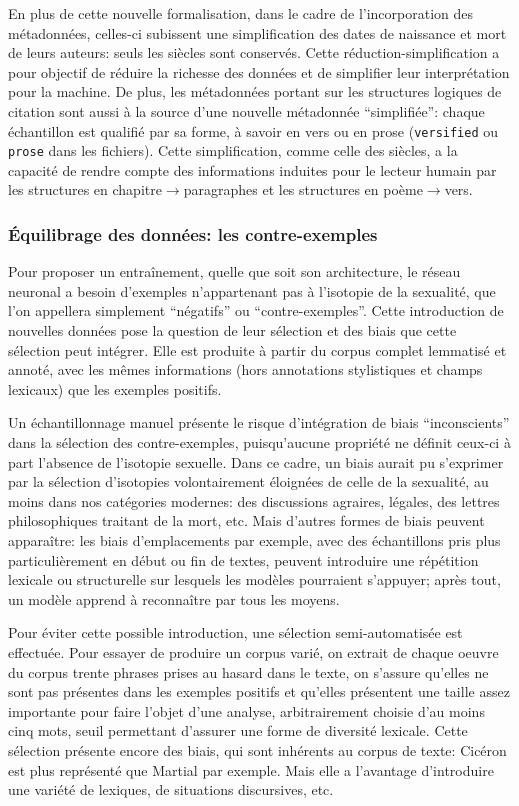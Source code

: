 En plus de cette nouvelle formalisation, dans le cadre de l'incorporation des métadonnées, celles-ci subissent une simplification des dates de naissance et mort de leurs auteurs: seuls les siècles sont conservés. Cette réduction-simplification a pour objectif de réduire la richesse des données et de simplifier leur interprétation pour la machine. De plus, les métadonnées portant sur les structures logiques de citation sont aussi à la source d'une nouvelle métadonnée \enquote{simplifiée}: chaque échantillon est qualifié par sa forme, à savoir en vers ou en prose (\texttt{versified} ou \texttt{prose} dans les fichiers). Cette simplification, comme celle des siècles, a la capacité de rendre compte des informations induites pour le lecteur humain par les structures en chapitre$\longrightarrow$paragraphes et les structures en poème$\longrightarrow$vers.


\subsubsection{Équilibrage des données: les contre-exemples}

Pour proposer un entraînement, quelle que soit son architecture, le réseau neuronal a besoin d'exemples n'appartenant pas à l'isotopie de la sexualité, que l'on appellera simplement \enquote{négatifs} ou \enquote{contre-exemples}. Cette introduction de nouvelles données pose la question de leur sélection et des biais que cette sélection peut intégrer. Elle est produite à partir du corpus complet lemmatisé et annoté, avec les mêmes informations (hors annotations stylistiques et champs lexicaux) que les exemples positifs.

Un échantillonnage manuel présente le risque d'intégration de biais \enquote{inconscients} dans la sélection des contre-exemples, puisqu'aucune propriété ne définit ceux-ci à part l'absence de l'isotopie sexuelle. Dans ce cadre, un biais aurait pu s'exprimer par la sélection d'isotopies volontairement éloignées de celle de la sexualité, au moins dans nos catégories modernes: des discussions agraires, légales, des lettres philosophiques traitant de la mort, etc. Mais d'autres formes de biais peuvent apparaître: les biais d'emplacements par exemple, avec des échantillons pris plus particulièrement en début ou fin de textes, peuvent introduire une répétition lexicale ou structurelle sur lesquels les modèles pourraient s'appuyer; après tout, un modèle apprend à reconnaître par tous les moyens.

Pour éviter cette possible introduction, une sélection semi-automatisée est effectuée. Pour essayer de produire un corpus varié, on extrait de chaque oeuvre du corpus trente phrases prises au hasard dans le texte, on s'assure qu'elles ne sont pas présentes dans les exemples positifs et qu'elles présentent une taille assez importante pour faire l'objet d'une analyse, arbitrairement choisie d'au moins cinq mots, seuil permettant d'assurer une forme de diversité lexicale. Cette sélection présente encore des biais, qui sont inhérents au corpus de texte: Cicéron est plus représenté que Martial par exemple. Mais elle a l'avantage d'introduire une variété de lexiques, de situations discursives, etc.

